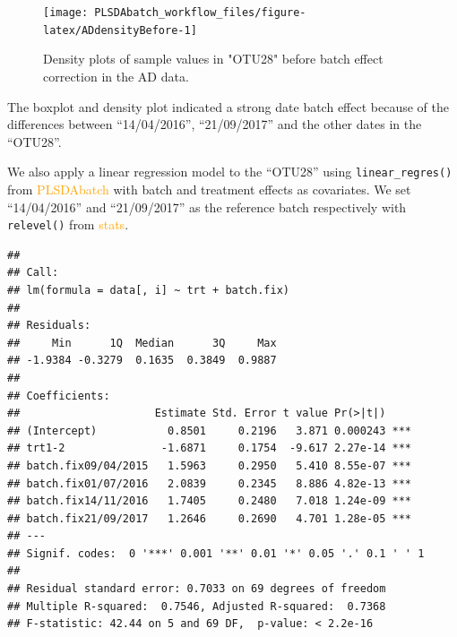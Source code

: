 \documentclass[
]{book}
\newenvironment{Shaded}{\begin{snugshade}}{\end{snugshade}}
\newcommand{\AttributeTok}[1]{\textcolor[rgb]{0.77,0.63,0.00}{#1}}
\newcommand{\CommentTok}[1]{\textcolor[rgb]{0.56,0.35,0.01}{\textit{#1}}}
\newcommand{\FunctionTok}[1]{\textcolor[rgb]{0.00,0.00,0.00}{#1}}
\newcommand{\NormalTok}[1]{#1}
\newcommand{\OtherTok}[1]{\textcolor[rgb]{0.56,0.35,0.01}{#1}}
\newcommand{\SpecialCharTok}[1]{\textcolor[rgb]{0.00,0.00,0.00}{#1}}
\newcommand{\StringTok}[1]{\textcolor[rgb]{0.31,0.60,0.02}{#1}}
\begin{document}
\begin{figure}

{\centering \texttt{[image: PLSDAbatch\_workflow\_files/figure-latex/ADdensityBefore-1]} 

}

\caption{Density plots of sample values in "OTU28" before batch effect correction in the AD data.}\label{fig:ADdensityBefore}
\end{figure}

The boxplot and density plot indicated a strong date batch effect because of the differences between ``14/04/2016'', ``21/09/2017'' and the other dates in the ``OTU28''.

We also apply a linear regression model to the ``OTU28'' using \texttt{linear\_regres()} from \textcolor{orange}{PLSDAbatch} with batch and treatment effects as covariates. We set ``14/04/2016'' and ``21/09/2017'' as the reference batch respectively with \texttt{relevel()} from \textcolor{orange}{stats}.

\begin{Shaded}
\end{Shaded}

\begin{verbatim}
## 
## Call:
## lm(formula = data[, i] ~ trt + batch.fix)
## 
## Residuals:
##     Min      1Q  Median      3Q     Max 
## -1.9384 -0.3279  0.1635  0.3849  0.9887 
## 
## Coefficients:
##                     Estimate Std. Error t value Pr(>|t|)    
## (Intercept)           0.8501     0.2196   3.871 0.000243 ***
## trt1-2               -1.6871     0.1754  -9.617 2.27e-14 ***
## batch.fix09/04/2015   1.5963     0.2950   5.410 8.55e-07 ***
## batch.fix01/07/2016   2.0839     0.2345   8.886 4.82e-13 ***
## batch.fix14/11/2016   1.7405     0.2480   7.018 1.24e-09 ***
## batch.fix21/09/2017   1.2646     0.2690   4.701 1.28e-05 ***
## ---
## Signif. codes:  0 '***' 0.001 '**' 0.01 '*' 0.05 '.' 0.1 ' ' 1
## 
## Residual standard error: 0.7033 on 69 degrees of freedom
## Multiple R-squared:  0.7546, Adjusted R-squared:  0.7368 
## F-statistic: 42.44 on 5 and 69 DF,  p-value: < 2.2e-16
\end{verbatim}
\end{document}
